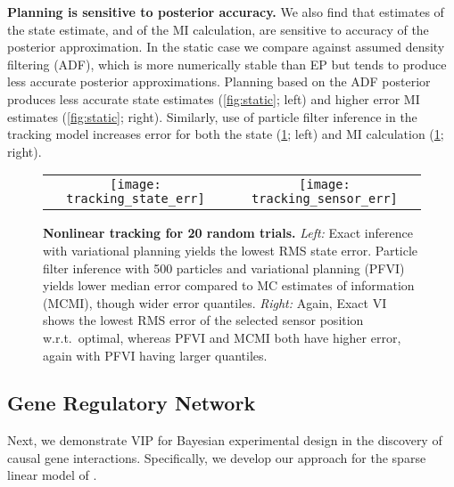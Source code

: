 \textbf{Planning is sensitive to posterior accuracy.}  We also find
that estimates of the state estimate, and of the MI calculation, are
sensitive to accuracy of the posterior approximation.  In the static
case we compare against assumed density filtering (ADF), which is more
numerically stable than EP but tends to produce less accurate
posterior approximations.  Planning based on the ADF posterior
produces less accurate state estimates (\FIG\ref{fig:static}; left)
and higher error MI estimates (\FIG\ref{fig:static}; right).
Similarly, use of particle filter inference in the tracking model
increases error for both the state (\FIG\ref{fig:dynamic}; left) and
MI calculation (\FIG\ref{fig:dynamic}; right).



\begin{figure}[t]
  \begin{tabular}{cc}
    \hspace{-3mm}\texttt{[image: tracking\_state\_err]} &
    \hspace{-3mm}\texttt{[image: tracking\_sensor\_err]}
  \end{tabular}
  
  \caption{\small\textbf{Nonlinear tracking for 20 random
  trials.}  \emph{Left:} Exact inference with variational planning
  yields the lowest RMS state error.  Particle filter inference with
  500 particles and variational planning (PFVI) yields lower median
  error compared to MC estimates of information (MCMI), though wider
  error quantiles.  \emph{Right:} Again, Exact VI shows the lowest RMS
  error of the selected sensor position w.r.t.~optimal, whereas PFVI
  and MCMI both have higher error, again with PFVI having larger
  quantiles.}\vspace{-5mm}
  \label{fig:dynamic}

\end{figure}





\subsection{Gene Regulatory Network}

Next, we demonstrate VIP for Bayesian experimental design in the
discovery of causal gene interactions.  Specifically, we develop our
approach for the sparse linear model of \cite{steinke2007experimental,
  seeger2008bayesian}.

